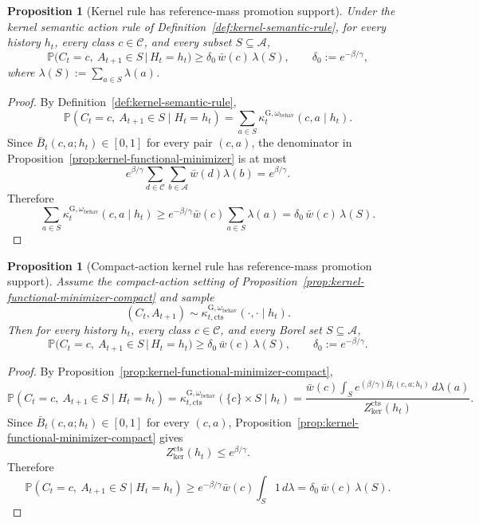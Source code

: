 \documentclass[11pt]{article}
\newtheorem{proposition}[theorem]{Proposition}
\theoremstyle{definition}
\theoremstyle{remark}
\newcommand{\Acal}{\mathcal{A}}
\newcommand{\Ccal}{\mathcal{C}}
\newcommand{\Prob}{\mathbb{P}}
\begin{document}
\begin{proposition}[Kernel rule has reference-mass promotion support]
\label{prop:kernel-promotion-support}
Under the kernel semantic action rule of Definition~\ref{def:kernel-semantic-rule}, for every history $h_t$, every class $c\in\Ccal$, and every subset $S\subseteq\Acal$,
\[
\Prob\bigl(C_t=c,\ A_{t+1}\in S\,\big|\,H_t=h_t\bigr)\ge \delta_0\,\bar w(c)\,\lambda(S),
\qquad
\delta_0:=e^{-\beta/\gamma},
\]
where $\lambda(S):=\sum_{a\in S}\lambda(a)$.
\end{proposition}

\begin{proof}
By Definition~\ref{def:kernel-semantic-rule},
\[
\Prob(C_t=c,\ A_{t+1}\in S\mid H_t=h_t)
=
\sum_{a\in S}\kappa_t^{\mathrm G,\omega_{\mathrm{behav}}}(c,a\mid h_t).
\]
Since $\bar B_t(c,a;h_t)\in[0,1]$ for every pair $(c,a)$, the denominator in Proposition~\ref{prop:kernel-functional-minimizer} is at most
\[
e^{\beta/\gamma}\sum_{d\in\Ccal}\sum_{b\in\Acal}\bar w(d)\lambda(b)=e^{\beta/\gamma}.
\]
Therefore
\[
\sum_{a\in S}\kappa_t^{\mathrm G,\omega_{\mathrm{behav}}}(c,a\mid h_t)
\ge
e^{-\beta/\gamma}\bar w(c)\sum_{a\in S}\lambda(a)
=
\delta_0\,\bar w(c)\,\lambda(S).
\]
\end{proof}

\begin{proposition}[Compact-action kernel rule has reference-mass promotion support]
\label{prop:kernel-promotion-support-compact}
Assume the compact-action setting of Proposition~\ref{prop:kernel-functional-minimizer-compact} and sample
\[
(C_t,A_{t+1})\sim \kappa_{t,\mathrm{cts}}^{\mathrm G,\omega_{\mathrm{behav}}}(\cdot,\cdot\mid h_t).
\]
Then for every history $h_t$, every class $c\in\Ccal$, and every Borel set $S\subseteq\Acal$,
\[
\Prob\bigl(C_t=c,\ A_{t+1}\in S\,\big|\,H_t=h_t\bigr)\ge \delta_0\,\bar w(c)\,\lambda(S),
\qquad
\delta_0:=e^{-\beta/\gamma}.
\]
\end{proposition}

\begin{proof}
By Proposition~\ref{prop:kernel-functional-minimizer-compact},
\[
\Prob(C_t=c,\ A_{t+1}\in S\mid H_t=h_t)
=
\kappa_{t,\mathrm{cts}}^{\mathrm G,\omega_{\mathrm{behav}}}(\{c\}\times S\mid h_t)
=
\frac{\bar w(c)\int_S e^{(\beta/\gamma)\bar B_t(c,a;h_t)}\,d\lambda(a)}
{Z_{\mathrm{ker}}^{\mathrm{cts}}(h_t)}.
\]
Since $\bar B_t(c,a;h_t)\in[0,1]$ for every $(c,a)$, Proposition~\ref{prop:kernel-functional-minimizer-compact} gives
\[
Z_{\mathrm{ker}}^{\mathrm{cts}}(h_t)\le e^{\beta/\gamma}.
\]
Therefore
\[
\Prob(C_t=c,\ A_{t+1}\in S\mid H_t=h_t)
\ge
e^{-\beta/\gamma}\bar w(c)\int_S 1\,d\lambda
=
\delta_0\,\bar w(c)\,\lambda(S).
\]
\end{proof}
\end{document}

